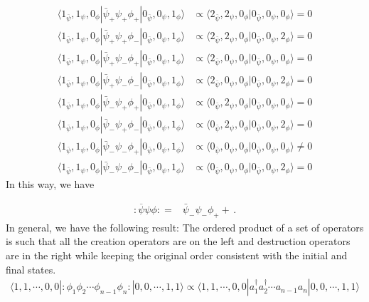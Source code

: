 \begin{align*}
 \langle1_{\bar{\psi}},1_{\psi},0_{\phi}|\bar{\psi}_{+}\psi_{+}\phi_{+}|0_{\bar{\psi}},0_{\psi},1_{\phi}\rangle  &\propto  \langle2_{\bar{\psi}},2_{\psi},0_{\phi}|0_{\bar{\psi}},0_{\psi},0_{\phi}\rangle =0\\ 
 \langle1_{\bar{\psi}},1_{\psi},0_{\phi}|\bar{\psi}_{+}\psi_{+}\phi_{-}|0_{\bar{\psi}},0_{\psi},1_{\phi}\rangle  &\propto  \langle2_{\bar{\psi}},2_{\psi},0_{\phi}|0_{\bar{\psi}},0_{\psi},2_{\phi}\rangle =0\\ 
 \langle1_{\bar{\psi}},1_{\psi},0_{\phi}|\bar{\psi}_{+}\psi_{-}\phi_{+}|0_{\bar{\psi}},0_{\psi},1_{\phi}\rangle  &\propto  \langle2_{\bar{\psi}},0_{\psi},0_{\phi}|0_{\bar{\psi}},0_{\psi},0_{\phi}\rangle =0\\ 
 \langle1_{\bar{\psi}},1_{\psi},0_{\phi}|\bar{\psi}_{+}\psi_{-}\phi_{-}|0_{\bar{\psi}},0_{\psi},1_{\phi}\rangle  &\propto  \langle2_{\bar{\psi}},0_{\psi},0_{\phi}|0_{\bar{\psi}},0_{\psi},2_{\phi}\rangle =0\\ 
 \langle1_{\bar{\psi}},1_{\psi},0_{\phi}|\bar{\psi}_{-}\psi_{+}\phi_{+}|0_{\bar{\psi}},0_{\psi},1_{\phi}\rangle  &\propto  \langle0_{\bar{\psi}},2_{\psi},0_{\phi}|0_{\bar{\psi}},0_{\psi},0_{\phi}\rangle =0\\ 
 \langle1_{\bar{\psi}},1_{\psi},0_{\phi}|\bar{\psi}_{-}\psi_{+}\phi_{-}|0_{\bar{\psi}},0_{\psi},1_{\phi}\rangle  &\propto  \langle0_{\bar{\psi}},2_{\psi},0_{\phi}|0_{\bar{\psi}},0_{\psi},2_{\phi}\rangle =0\\ 
 \langle1_{\bar{\psi}},1_{\psi},0_{\phi}|\bar{\psi}_{-}\psi_{-}\phi_{+}|0_{\bar{\psi}},0_{\psi},1_{\phi}\rangle  &\propto  \langle0_{\bar{\psi}},0_{\psi},0_{\phi}|0_{\bar{\psi}},0_{\psi},0_{\phi}\rangle \neq 0\\
 \langle1_{\bar{\psi}},1_{\psi},0_{\phi}|\bar{\psi}_{-}\psi_{-}\phi_{-}|0_{\bar{\psi}},0_{\psi},1_{\phi}\rangle  &\propto  \langle0_{\bar{\psi}},0_{\psi},0_{\phi}|0_{\bar{\psi}},0_{\psi},2_{\phi}\rangle =0
\end{align*}
In this way, we have

\begin{align}
:\overline{\psi}\psi\phi: =&\bar{\psi}_{-}\psi_{-}\phi_{+}+\,.
\end{align}
In general, we have the following result: The ordered product of a set of operators is such that all the creation operators are on the left and destruction operators are in the right while keeping the original order consistent with the initial and final states.
\begin{align}
\langle 1,1,\cdots,0,0|  :\phi_1 \phi_2 \cdots \phi_{n-1}\phi_n:|0,0,\cdots,1,1\rangle
\propto \langle 1,1,\cdots,0,0| a_1^{\dagger} a_2^{\dagger}\cdots a_{n-1}a_n|0,0,\cdots,1,1\rangle
\end{align}


